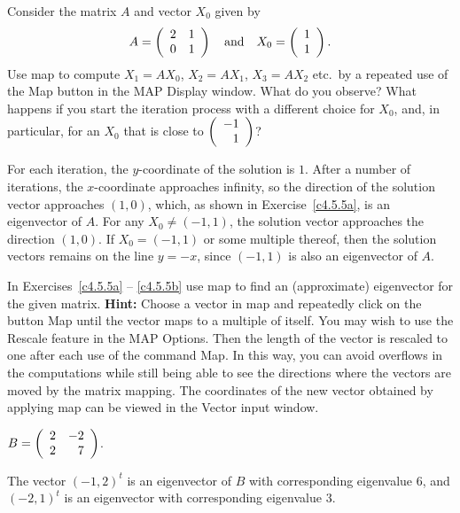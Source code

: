 \documentclass{ximera}
\begin{document}
\begin{exercise} \label{c4.5.6}
Consider the matrix $A$ and vector $X_0$ given by
\[
A=\left(\begin{array}{rr} 2 & 1\\ 0 &1\end{array}\right)\quad\mbox{and}\quad X_0=\left(\begin{array}{r} 1 \\ 1\end{array}\right).
\]
Use {\sf map} to compute $X_1 = AX_0$, $X_2 = AX_1$, $X_3=AX_2$ etc.\ by a
repeated use of the {\sf Map} button in the {\sf MAP Display} window.  What
do you observe?  What happens if you start the iteration process with a
different choice for $X_0$, and, in particular, for an $X_0$ that is close
to $\left(\begin{array}{r} -1 \\ 1\end{array}\right)$?

\begin{solution}

For each iteration, the $y$-coordinate of the solution is $1$.  After a
number of iterations, the $x$-coordinate approaches infinity, so the
direction of the solution vector approaches $(1,0)$, which, as shown
in Exercise~\ref{c4.5.5a}, is an eigenvector of $A$.  For any $X_0
\neq (-1,1)$, the solution vector approaches the direction
$(1,0)$.  If $X_0 = (-1,1)$ or some multiple thereof, then the solution
vectors remains on the line $y = -x$, since $(-1,1)$ is also an
eigenvector of $A$.

\end{solution}
\end{exercise}

\noindent In Exercises~\ref{c4.5.5a} -- \ref{c4.5.5b} use {\sf map} to find
an (approximate) eigenvector for the given matrix.  {\bf Hint:} Choose a
vector in {\sf map} and repeatedly click on the button {\sf Map} until the
vector maps to a multiple of itself.  You may wish to use the {\sf Rescale} 
feature in the {\sf MAP Options}.  Then the length of the vector is rescaled 
to one after each use of the command {\sf Map}. In this way, you can avoid
overflows in the computations while still being able to see the
directions where the vectors are moved by the matrix mapping.  The coordinates 
of the new vector obtained by applying {\sf map} can be viewed in the 
{\sf Vector input} window.

\begin{exercise} \label{c4.5.5a}
$B=\left(\begin{array}{rr} 2 & -2\\ 2 &7\end{array}\right)$.

\begin{solution}
The vector $(-1,2)^t$ is an eigenvector of $B$ with
corresponding eigenvalue $6$, and $(-2,1)^t$ is an eigenvector with
corresponding eigenvalue $3$.


\end{solution}
\end{exercise}
\end{document}
